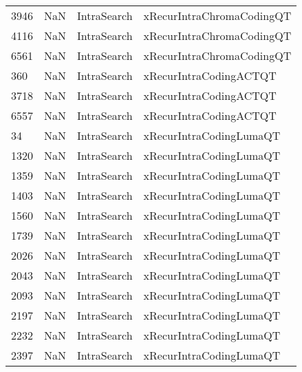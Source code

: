 \begin{tabular}{llll}
3946 &                   NaN &                IntraSearch &                 xRecurIntraChromaCodingQT \\
4116 &                   NaN &                IntraSearch &                 xRecurIntraChromaCodingQT \\
6561 &                   NaN &                IntraSearch &                 xRecurIntraChromaCodingQT \\
360  &                   NaN &                IntraSearch &                    xRecurIntraCodingACTQT \\
3718 &                   NaN &                IntraSearch &                    xRecurIntraCodingACTQT \\
6557 &                   NaN &                IntraSearch &                    xRecurIntraCodingACTQT \\
34   &                   NaN &                IntraSearch &                   xRecurIntraCodingLumaQT \\
1320 &                   NaN &                IntraSearch &                   xRecurIntraCodingLumaQT \\
1359 &                   NaN &                IntraSearch &                   xRecurIntraCodingLumaQT \\
1403 &                   NaN &                IntraSearch &                   xRecurIntraCodingLumaQT \\
1560 &                   NaN &                IntraSearch &                   xRecurIntraCodingLumaQT \\
1739 &                   NaN &                IntraSearch &                   xRecurIntraCodingLumaQT \\
2026 &                   NaN &                IntraSearch &                   xRecurIntraCodingLumaQT \\
2043 &                   NaN &                IntraSearch &                   xRecurIntraCodingLumaQT \\
2093 &                   NaN &                IntraSearch &                   xRecurIntraCodingLumaQT \\
2197 &                   NaN &                IntraSearch &                   xRecurIntraCodingLumaQT \\
2232 &                   NaN &                IntraSearch &                   xRecurIntraCodingLumaQT \\
2397 &                   NaN &                IntraSearch &                   xRecurIntraCodingLumaQT \\

\end{tabular}
